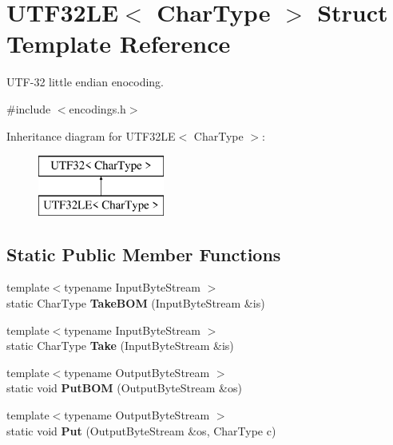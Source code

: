 \hypertarget{a02164}{}\section{U\+T\+F32\+LE$<$ Char\+Type $>$ Struct Template Reference}
\label{a02164}


U\+T\+F-\/32 little endian enocoding.  




{\ttfamily \#include $<$encodings.\+h$>$}

Inheritance diagram for U\+T\+F32\+LE$<$ Char\+Type $>$\+:\begin{figure}[H]
\begin{center}
\leavevmode
\includegraphics[height=2.000000cm]{a02164}
\end{center}
\end{figure}
\subsection*{Static Public Member Functions}
\begin{DoxyCompactItemize}
\item 
\mbox{\label{a02164_a8729612b0a8b1126c61c4f8f8c34410e}} 
{\footnotesize template$<$typename Input\+Byte\+Stream $>$ }\\static Char\+Type {\bfseries Take\+B\+OM} (Input\+Byte\+Stream \&is)
\item 
\mbox{\label{a02164_ad13967549811be12897362bb37b2c819}} 
{\footnotesize template$<$typename Input\+Byte\+Stream $>$ }\\static Char\+Type {\bfseries Take} (Input\+Byte\+Stream \&is)
\item 
\mbox{\label{a02164_accd97d45e55746c900dab356605825be}} 
{\footnotesize template$<$typename Output\+Byte\+Stream $>$ }\\static void {\bfseries Put\+B\+OM} (Output\+Byte\+Stream \&os)
\item 
\mbox{\label{a02164_a61bb50e7fba27e3fe28a9f30eb366193}} 
{\footnotesize template$<$typename Output\+Byte\+Stream $>$ }\\static void {\bfseries Put} (Output\+Byte\+Stream \&os, Char\+Type c)
\end{DoxyCompactItemize}
